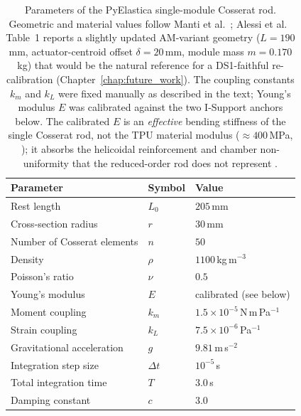 \begin{table}[ht]
\centering
\caption[Simulator parameters for the PyElastica I-Support rod.]{Parameters of the PyElastica single-module Cosserat rod. Geometric and material values follow Manti et al.\ \cite{manti2016soft}; Alessi et al.\ \cite{alessi2024pushing} Table~1 reports a slightly updated AM-variant geometry ($L = 190$\,mm, actuator-centroid offset $\delta = 20$\,mm, module mass $m = 0.170$\,kg) that would be the natural reference for a DS1-faithful re-calibration (Chapter~\ref{chap:future_work}). The coupling constants $k_m$ and $k_L$ were fixed manually as described in the text; Young's modulus $E$ was calibrated against the two I-Support anchors below. The calibrated $E$ is an \emph{effective} bending stiffness of the single Cosserat rod, not the TPU material modulus ($\approx 400$\,MPa, \cite{centurelli2022closed}); it absorbs the helicoidal reinforcement and chamber non-uniformity that the reduced-order rod does not represent \cite{dellasantina2018dynamic}.}
\label{tab:sim_params}
\begin{tabularx}{\linewidth}{@{}l l X@{}}
\toprule
Parameter                      & Symbol       & Value                                     \\
\midrule
Rest length                    & $L_0$        & $205$\,mm                                 \\
Cross-section radius           & $r$          & $30$\,mm                                  \\
Number of Cosserat elements    & $n$          & $50$                                      \\
Density                        & $\rho$       & $1100$\,kg\,m$^{-3}$                      \\
Poisson's ratio                & $\nu$        & $0.5$                                     \\
Young's modulus                & $E$          & calibrated (see below)                    \\
Moment coupling                & $k_m$        & $1.5 \times 10^{-5}$\,N\,m\,Pa$^{-1}$     \\
Strain coupling                & $k_L$        & $7.5 \times 10^{-6}$\,Pa$^{-1}$           \\
Gravitational acceleration     & $g$          & $9.81$\,m\,s$^{-2}$                       \\
Integration step size          & $\Delta t$   & $10^{-5}$\,s                              \\
Total integration time         & $T$          & $3.0$\,s                                  \\
Damping constant               & $c$          & $3.0$                                     \\
\bottomrule
\end{tabularx}
\end{table}

